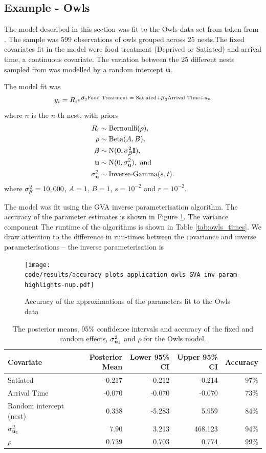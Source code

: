 			\subsection{Example - Owls}
			The model described in this section was fit to the Owls data set from taken from \cite{zuur_mixed_2009}.
			The sample was 599 observations of owls grouped across 25 nests.The fixed covariates
			fit in the model were food treatment (Deprived or Satiated) and arrival time, a continuous covariate.
			The variation between the 25 different nests sampled from was modelled by a random intercept
			${\bf u}$.

			The model fit was
			\[
			y_i = R_i e^{{\boldsymbol \beta}_2 \text{Food Treatment = Satiated} + {\boldsymbol \beta}_3 \text{Arrival Time} + u_n}
			\]
			where $n$ is the $n$-th nest, with priors
			\begin{align*}
			R_i &\sim \text{Bernoulli}(\rho), \\
			\rho &\sim \text{Beta}(A, B), \\
			{\boldsymbol \beta} &\sim \text{N}({\bf 0}, \sigma_{\boldsymbol \beta}^2 {\bf I}), \\
			{\bf u} &\sim \text{N}(0, \sigma_{\bf u}^2), \text { and } \\
			\sigma_{\bf u}^2 &\sim \text{Inverse-Gamma}(s, t).
			\end{align*}
			where $\sigma_{\boldsymbol \beta}^2=10,000$, $A=1$, $B=1$, $s=10^{-2}$ and $r=10^{-2}$.

			The model was fit using the GVA inverse parameterisation algorithm. The accuracy of the parameter
			estimates is shown in Figure \ref{fig:owls}. The variance component
			The runtime of the algorithms is shown in Table
			\ref{tab:owls_times}. We draw attention to the difference in run-times between the covariance and
			inverse parameterisations -- the inverse parameterisation is 

			\begin{figure}
				\texttt{[image: code/results/accuracy\_plots\_application\_owls\_GVA\_inv\_param-highlights-nup.pdf]}
				\caption{Accuracy of the approximations of the parameters fit to the Owls data}
				\label{fig:owls}
			\end{figure}

			\begin{table}
				\begin{tabular}{|l|rrrr|}
					\hline
					Covariate          & Posterior Mean & Lower 95\% CI & Upper 95\% CI & Accuracy \\
					\hline
					Satiated & -0.217 & -0.212 & -0.214 & 97\% \\
					Arrival Time & -0.070 & -0.070 & -0.070 & 73\% \\
					Random intercept (nest) & 0.338 & -5.283 & 5.959 & 84\% \\
					$\sigma_{{\bf u}_1}^2$ & 7.90 & 3.213 & 468.123 & 94\% \\
					$\rho$ & 0.739 & 0.703 & 0.774 & 99\% \\
					\hline
				\end{tabular}			
				\label{tab:owls_results}
				\caption{The posterior means, 95\% confidence intervals and accuracy of the fixed and random
									effects, $\sigma_{{\bf u}_1}^2$ and $\rho$ for the Owls model.}
			\end{table}

